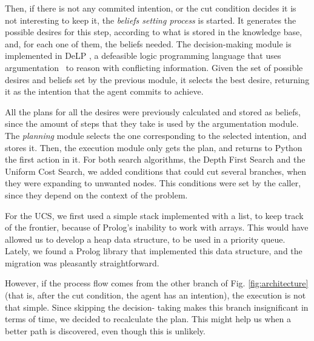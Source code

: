     Then, if there is not any commited intention, or the cut condition decides
    it is not interesting to keep it, the \textit{beliefs setting process} is
    started. It generates the possible desires for this step, according to what
    is stored in the knowledge base, and, for each one of them, the beliefs
    needed.  The decision-making module is implemented in
    DeLP \cite{Rotstein:2007} \cite{Ferretti:2008}, a defeasible logic
    programming language that uses argumentation \cite{DBLP:conf/comma/2008}\ to
    reason with conflicting information.  Given the set of possible desires and
    beliefs set by the previous module, it selects the best desire, returning it
    as the intention that the agent commits to achieve.

    All the plans for all the desires were previously calculated and stored as 
    beliefs, since the amount of steps that they take is used by the 
    argumentation module. The \textit{planning} module selects the one 
    corresponding to the selected intention, and stores it. Then, the 
    execution module only gets the plan, and returns to Python the first 
    action in it.
    For both search algorithms, the Depth First Search and the Uniform Cost 
    Search, we added conditions that could cut several branches, when they were 
    expanding to unwanted nodes. This conditions were set by the caller, since 
    they depend on the context of the problem.

    For the UCS, we first used a simple stack implemented with a list, to keep 
    track of the frontier, because of Prolog's inability to work with arrays. This 
    would have allowed us to develop a heap data structure, to be used in a 
    priority queue. Lately, we found a Prolog library that implemented this data 
    structure, and the migration was pleasantly straightforward.

    However, if the process flow comes from the other branch of Fig. 
    \ref{fig:architecture} (that is, after the cut condition, the agent has an 
    intention), the execution is not that simple. Since skipping the decision-
    taking makes this branch insignificant in terms of time, we decided to 
    recalculate the plan. This might help us when a better path is discovered, 
    even though this is unlikely.

